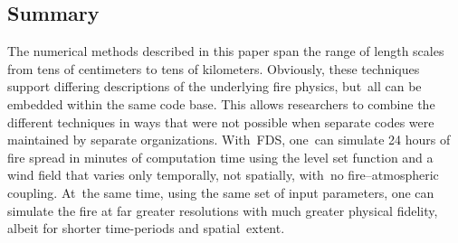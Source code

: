 \documentclass[atmosphere,article,accept,moreauthors,pdftex]{Definitions/mdpi}
\begin{document}
\begin{paracol}{2}
\section{Summary} \label{sec:summary}

The numerical methods described in this paper span the range of length scales from tens of centimeters to tens of kilometers. Obviously, these techniques support differing descriptions of the underlying fire physics, but~all can be embedded within the same code base. This allows researchers to combine the different techniques in ways that were not possible when separate codes were maintained by separate organizations. With~FDS, \mbox{one can} simulate 24 hours of fire spread in minutes of computation time using the level set function and a wind field that varies only temporally, not spatially, with~no fire–atmospheric coupling. At~the same time, using the same set of input parameters, one can simulate the fire at far greater resolutions with much greater physical fidelity, albeit for shorter time-periods and spatial~extent.

\vspace{6pt}




 


\end{paracol}
\end{document}
